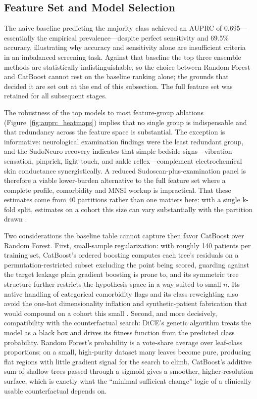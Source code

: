 \documentclass[pdflatex,sn-mathphys-num]{sn-jnl}%
\theoremstyle{thmstyleone}%
\theoremstyle{thmstyletwo}%
\theoremstyle{thmstylethree}%
\begin{document}
\subsection{Feature Set and Model Selection}
\label{sec:catboost_vs_rf}

The naive baseline predicting the majority class achieved an AUPRC of 0.695---essentially the
empirical prevalence---despite perfect sensitivity and 69.5\% accuracy, illustrating why accuracy and
sensitivity alone are insufficient criteria in an imbalanced screening task. Against that baseline
the top three ensemble methods are statistically indistinguishable, so the choice between Random
Forest and CatBoost cannot rest on the baseline ranking alone; the grounds that decided it are set
out at the end of this subsection. The full feature set was retained for all subsequent stages.

The robustness of the top models to most feature-group ablations (Figure~\ref{fig:auprc_heatmaps})
implies that no single group is indispensable and that redundancy across the feature space is
substantial. The exception is informative: neurological examination findings were the least redundant
group, and the SudoNeuro recovery indicates that simple bedside signs---vibration sensation, pinprick,
light touch, and ankle reflex---complement electrochemical skin conductance synergistically. A reduced
Sudoscan-plus-examination panel is therefore a viable lower-burden alternative to the full feature set
where a complete profile, comorbidity and MNSI workup is impractical. That these estimates come from
40 partitions rather than one matters here: with a single k-fold split, estimates on a cohort this
size can vary substantially with the partition drawn \cite{kim2009estimating}.

Two considerations the baseline table cannot capture then favor CatBoost over Random Forest. First, small-sample
regularization: with roughly 140 patients per training set, CatBoost's ordered boosting computes each
tree's residuals on a permutation-restricted subset excluding the point being scored, guarding
against the target leakage plain gradient boosting is prone to, and its symmetric tree structure
further restricts the hypothesis space in a way suited to small $n$. Its native handling of
categorical comorbidity flags and its class reweighting also avoid the one-hot dimensionality
inflation and synthetic-patient fabrication that would compound on a cohort this small
\cite{dorogush2018catboost}. Second, and more decisively, compatibility with the counterfactual
search: DiCE's genetic algorithm treats the model as a black box and drives its fitness function from
the predicted class probability. Random Forest's probability is a vote-share average over leaf-class
proportions; on a small, high-purity dataset many leaves become pure, producing flat regions with
little gradient signal for the search to climb. CatBoost's additive sum of shallow trees passed
through a sigmoid gives a smoother, higher-resolution surface, which is exactly what the ``minimal
sufficient change'' logic of a clinically usable counterfactual depends on.
\end{document}
